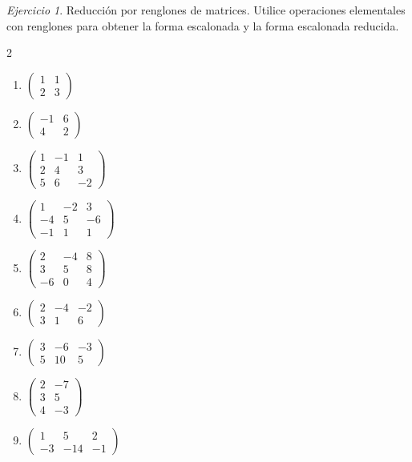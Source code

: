 \documentclass[12pt]{article}
\theoremstyle{remark}
\newtheorem{Ejer}[definicion]{Ejercicio}
\begin{document}
\begin{Ejer} Reducción por renglones de matrices. Utilice operaciones elementales con renglones para obtener la forma escalonada y la forma escalonada reducida.

\begin{multicols}{2}
\begin{enumerate}[resume]
\item $\begin{pmatrix}1&1\\2&3\end{pmatrix}$
\item $\begin{pmatrix}-1&6\\4&2\end{pmatrix}$
\item $\begin{pmatrix}1&-1&1\\2&4&3\\5&6&-2\end{pmatrix}$
\item $\begin{pmatrix}1&-2&3\\-4&5&-6\\-1&1&1\end{pmatrix}$
\item $\begin{pmatrix}2&-4&8\\3&5&8\\-6&0&4\end{pmatrix}$
\item $\begin{pmatrix}2&-4&-2\\3&1&6\end{pmatrix}$
\item $\begin{pmatrix}3&-6&-3\\5&10&5\end{pmatrix}$
\item $\begin{pmatrix}2&-7\\3&5\\4&-3\end{pmatrix}$
\item $\begin{pmatrix}1&5&2\\-3&-14&-1\end{pmatrix}$
\end{enumerate}
\end{multicols}
\end{Ejer}
\end{document}
